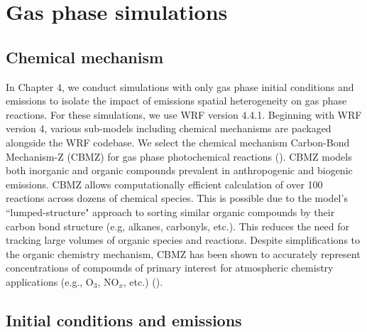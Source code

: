 \section{Gas phase simulations}

\subsection{Chemical mechanism}
In Chapter 4, we conduct simulations with only gas phase initial conditions and emissions to isolate the impact of emissions spatial heterogeneity on gas phase reactions. For these simulations, we use WRF version 4.4.1. Beginning with WRF version 4, various sub-models including chemical mechanisms are packaged alongside the WRF codebase. We select the chemical mechanism Carbon-Bond Mechanism-Z (CBMZ) for gas phase photochemical reactions (\cite{zaveri_new_1999}). CBMZ models both inorganic and organic compounds prevalent in anthropogenic and biogenic emissions. CBMZ allows computationally efficient calculation of over 100 reactions across dozens of chemical species. This is possible due to the model's ``lumped-structure" approach to sorting similar organic compounds by their carbon bond structure (e.g, alkanes, carbonyls, etc.). This reduces the need for tracking large volumes of organic species and reactions. Despite simplifications to the organic chemistry mechanism, CBMZ has been shown to accurately represent concentrations of compounds of primary interest for atmospheric chemistry applications (e.g., O$_3$, NO$_x$, etc.) (\cite{zaveri_new_1999}). 

\subsection{Initial conditions and emissions}\label{gas-phase-ics-and-emiss}

